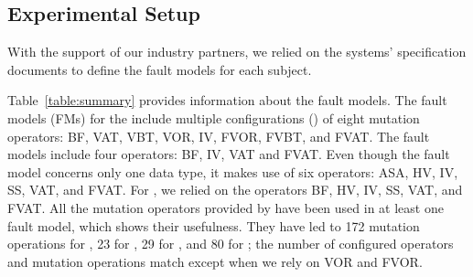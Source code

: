 

\subsection{Experimental Setup}


With the support of our industry partners, we relied on  
 the systems' specification documents 
 to define the fault models for each subject.
 







{Table~\ref{table:summary} provides information about the fault models.}
The fault models (FMs) for the \ADCS include multiple configurations () of eight mutation operators: BF, VAT, VBT, VOR, IV, FVOR, FVBT, and FVAT.
The \PDHU fault models include four operators: BF, IV, VAT and FVAT.
Even though the \GPS fault model concerns only one data type, it makes use of six operators: ASA, HV, IV, SS, VAT, and FVAT.
For \PARAM, we relied on the operators BF, HV, IV, SS, VAT, and FVAT.
All the mutation operators provided by \APPR have been used in at least one fault model, which shows their usefulness.
{They have led to 172 mutation operations for \ADCS, 23 for \GPS, 29 for \PDHU, and 80 for \PARAM; the number of configured operators and mutation operations match except when we rely on VOR and FVOR.}


